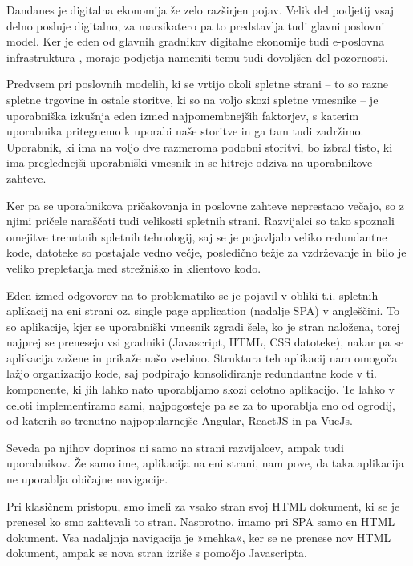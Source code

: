 \documentclass[a4paper, 12pt]{book}
\begin{document}
Dandanes je digitalna ekonomija že zelo razširjen pojav. Velik del podjetij vsaj delno posluje digitalno, za marsikatero pa to predstavlja tudi glavni poslovni model. Ker je eden od glavnih gradnikov digitalne ekonomije tudi e-poslovna infrastruktura \cite{digital_econ}, morajo podjetja nameniti temu tudi dovoljšen del pozornosti.

Predvsem pri poslovnih modelih, ki se vrtijo okoli spletne strani – to so razne spletne trgovine in ostale storitve, ki so na voljo skozi spletne vmesnike – je uporabniška izkušnja eden izmed najpomembnejših faktorjev, s katerim uporabnika pritegnemo k uporabi naše storitve in ga tam tudi zadržimo. Uporabnik, ki ima na voljo dve razmeroma podobni storitvi, bo izbral  tisto, ki ima preglednejši uporabniški vmesnik in se hitreje odziva na uporabnikove zahteve. 

Ker pa se uporabnikova pričakovanja in poslovne zahteve neprestano večajo, so z njimi pričele naraščati tudi velikosti spletnih strani. Razvijalci so tako spoznali omejitve trenutnih spletnih tehnologij, saj se je pojavljalo veliko redundantne kode, datoteke so postajale vedno večje, posledično težje za vzdrževanje in bilo je veliko prepletanja med strežniško in klientovo kodo.

Eden izmed odgovorov na to problematiko se je pojavil v obliki t.i. spletnih aplikacij na eni strani oz. single page application (nadalje SPA) v angleščini. To so aplikacije, kjer se uporabniški vmesnik zgradi šele, ko je stran naložena, torej najprej se prenesejo vsi gradniki (Javascript, HTML, CSS datoteke), nakar pa se aplikacija zažene in prikaže našo vsebino. Struktura teh aplikacij nam omogoča lažjo organizacijo kode, saj podpirajo konsolidiranje redundantne kode v ti. komponente, ki jih lahko nato uporabljamo skozi celotno aplikacijo. Te lahko v celoti implementiramo sami, najpogosteje pa se za to uporablja eno od ogrodij, od katerih so trenutno najpopularnejše Angular, ReactJS in pa VueJs.

Seveda pa njihov doprinos ni samo na strani razvijalcev, ampak tudi uporabnikov. Že samo ime, aplikacija na eni strani, nam pove, da taka aplikacija ne uporablja običajne navigacije.

Pri klasičnem pristopu, smo imeli za vsako stran svoj HTML dokument, ki se je prenesel ko smo zahtevali to stran. Nasprotno, imamo pri SPA samo en HTML dokument. Vsa nadaljnja navigacija je »mehka«, ker se ne prenese nov HTML dokument, ampak se nova stran izriše s pomočjo Javascripta.
\end{document}
